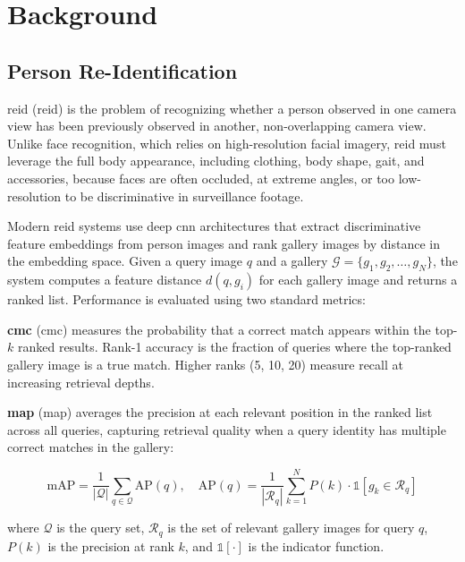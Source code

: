\chapter{Background}

\section{Person Re-Identification}

\acrlong{reid} (\acrshort{reid}) is the problem of recognizing whether a person observed in one camera view has been previously observed in another, non-overlapping camera view. Unlike face recognition, which relies on high-resolution facial imagery, \acrshort{reid} must leverage the full body appearance, including clothing, body shape, gait, and accessories, because faces are often occluded, at extreme angles, or too low-resolution to be discriminative in surveillance footage.

Modern \acrshort{reid} systems use deep \acrlong{cnn} architectures that extract discriminative feature embeddings from person images and rank gallery images by distance in the embedding space. Given a query image $q$ and a gallery $\mathcal{G} = \{g_1, g_2, \ldots, g_N\}$, the system computes a feature distance $d(q, g_i)$ for each gallery image and returns a ranked list. Performance is evaluated using two standard metrics:

\textbf{\acrlong{cmc}} (\acrshort{cmc}) measures the probability that a correct match appears within the top-$k$ ranked results. Rank-1 accuracy is the fraction of queries where the top-ranked gallery image is a true match. Higher ranks (5, 10, 20) measure recall at increasing retrieval depths.

\textbf{\acrlong{map}} (\acrshort{map}) averages the precision at each relevant position in the ranked list across all queries, capturing retrieval quality when a query identity has multiple correct matches in the gallery:

\begin{equation}
    \text{mAP} = \frac{1}{|\mathcal{Q}|} \sum_{q \in \mathcal{Q}} \text{AP}(q), \quad \text{AP}(q) = \frac{1}{|\mathcal{R}_q|} \sum_{k=1}^{N} P(k) \cdot \mathbb{1}[g_k \in \mathcal{R}_q]
    \label{eq:map}
\end{equation}

where $\mathcal{Q}$ is the query set, $\mathcal{R}_q$ is the set of relevant gallery images for query $q$, $P(k)$ is the precision at rank $k$, and $\mathbb{1}[\cdot]$ is the indicator function.


